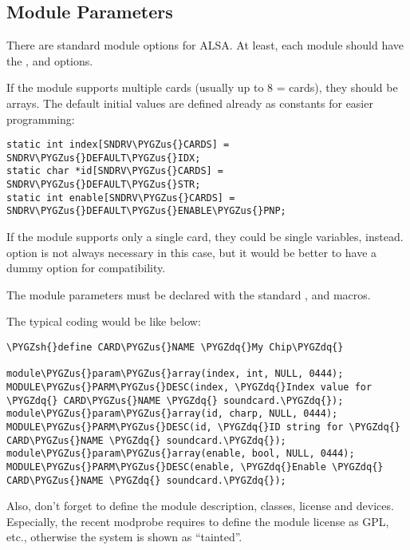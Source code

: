 \documentclass[a4paper,8pt,english]{sphinxmanual}
\def\PYGZus{\char`\_}
\def\PYGZsh{\char`\#}
\def\PYGZdq{\char`\"}
\begin{document}
\subsection{Module Parameters}
\label{sound/kernel-api/writing-an-alsa-driver:module-parameters}
There are standard module options for ALSA. At least, each module should
have the ,  and  options.

If the module supports multiple cards (usually up to 8 = 
cards), they should be arrays. The default initial values are defined
already as constants for easier programming:

\begin{Verbatim}[commandchars=\\\{\}]
static int index[SNDRV\PYGZus{}CARDS] = SNDRV\PYGZus{}DEFAULT\PYGZus{}IDX;
static char *id[SNDRV\PYGZus{}CARDS] = SNDRV\PYGZus{}DEFAULT\PYGZus{}STR;
static int enable[SNDRV\PYGZus{}CARDS] = SNDRV\PYGZus{}DEFAULT\PYGZus{}ENABLE\PYGZus{}PNP;
\end{Verbatim}

If the module supports only a single card, they could be single
variables, instead.  option is not always necessary in this
case, but it would be better to have a dummy option for compatibility.

The module parameters must be declared with the standard
,  and
 macros.

The typical coding would be like below:

\begin{Verbatim}[commandchars=\\\{\}]
\PYGZsh{}define CARD\PYGZus{}NAME \PYGZdq{}My Chip\PYGZdq{}

module\PYGZus{}param\PYGZus{}array(index, int, NULL, 0444);
MODULE\PYGZus{}PARM\PYGZus{}DESC(index, \PYGZdq{}Index value for \PYGZdq{} CARD\PYGZus{}NAME \PYGZdq{} soundcard.\PYGZdq{});
module\PYGZus{}param\PYGZus{}array(id, charp, NULL, 0444);
MODULE\PYGZus{}PARM\PYGZus{}DESC(id, \PYGZdq{}ID string for \PYGZdq{} CARD\PYGZus{}NAME \PYGZdq{} soundcard.\PYGZdq{});
module\PYGZus{}param\PYGZus{}array(enable, bool, NULL, 0444);
MODULE\PYGZus{}PARM\PYGZus{}DESC(enable, \PYGZdq{}Enable \PYGZdq{} CARD\PYGZus{}NAME \PYGZdq{} soundcard.\PYGZdq{});
\end{Verbatim}

Also, don't forget to define the module description, classes, license
and devices. Especially, the recent modprobe requires to define the
module license as GPL, etc., otherwise the system is shown as “tainted”.
\end{document}
